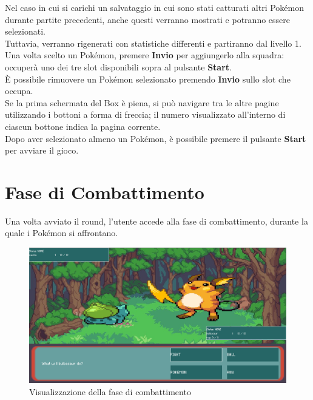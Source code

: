 \documentclass[a4paper,12pt]{report}
\begin{document}
{{Nel caso in cui si carichi un salvataggio in cui sono stati catturati altri Pokémon durante partite precedenti, anche questi verranno mostrati e potranno essere selezionati.\\
Tuttavia, verranno rigenerati con statistiche differenti e partiranno dal livello 1.\\
Una volta scelto un Pokémon, premere \textbf{Invio} per aggiungerlo alla squadra: occuperà uno dei tre slot disponibili sopra al pulsante \textbf{Start}.\\
È possibile rimuovere un Pokémon selezionato premendo \textbf{Invio} sullo slot che occupa.\\
Se la prima schermata del Box è piena, si può navigare tra le altre pagine utilizzando i bottoni a forma di freccia; il numero visualizzato all’interno di ciascun bottone indica la pagina corrente.\\
Dopo aver selezionato almeno un Pokémon, è possibile premere il pulsante \textbf{Start} per avviare il gioco.


\section{Fase di Combattimento}

Una volta avviato il round, l’utente accede alla fase di combattimento, durante la quale i Pokémon si affrontano.

\begin{figure}[H]
  \centering
  \includegraphics[width=\textwidth]{immagini/schermataFight.png}
  \caption{Visualizzazione della fase di combattimento}
  \label{fig:combat_phase}
\end{figure}

}}
\end{document}
